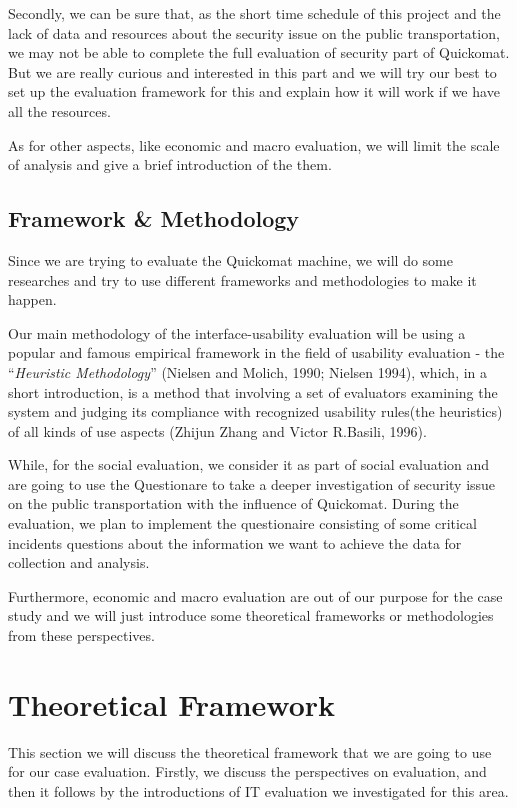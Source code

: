 \documentclass[twocolumn]{article}
\begin{document}
Secondly, we can be sure that, as the short time schedule of this project and the lack of data and resources about the security issue on the public transportation, we may not be able to complete the full evaluation of security part of Quickomat. But we are really curious and interested in this part and we will try our best to set up the evaluation framework for this and explain how it will work if we have all the resources. 

As for other aspects, like economic and  macro evaluation, we will limit the scale of analysis and give a brief introduction of the them.

\subsection{Framework \& Methodology}
Since we are trying to evaluate the Quickomat machine, we will do some researches and try to use different frameworks and methodologies to make it happen.

Our main methodology of the interface-usability evaluation will be using a popular and famous empirical framework in the field of usability evaluation - the “\emph{Heuristic Methodology}” (Nielsen and Molich, 1990; Nielsen 1994), which, in a short introduction, is a method that involving a set of evaluators examining the system and judging its compliance with recognized usability rules(the heuristics) of all kinds of use aspects (Zhijun Zhang and Victor R.Basili, 1996). 

While, for the social evaluation, we consider it as part of social evaluation and are going to use the Questionare to take a deeper investigation of security issue on the public transportation with the influence of Quickomat. During the evaluation, we plan to implement the questionaire consisting of some critical incidents questions about the information we want to achieve the data for collection and analysis. 

Furthermore, economic and macro evaluation are out of our purpose for the case study and we will just introduce some theoretical frameworks or methodologies from these perspectives.

\section{Theoretical Framework}
This section we will discuss the theoretical framework that we are going to use for our case evaluation. Firstly, we discuss the perspectives on evaluation, and then it follows by the introductions of IT evaluation we investigated for this area.
\end{document}
